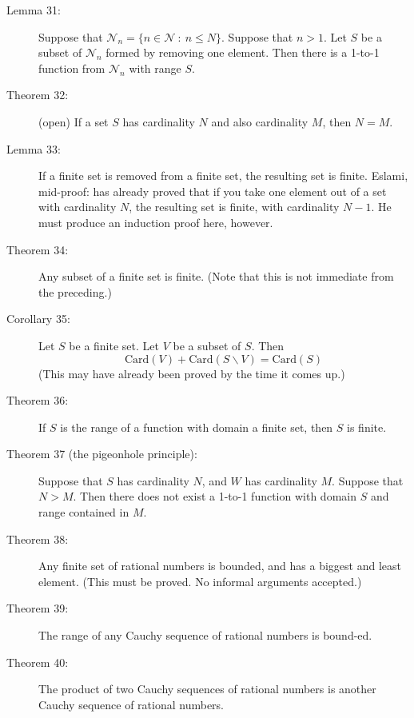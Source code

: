 \documentclass{article}
\begin{document}
\begin{description}
  \item[Lemma 31:] Suppose that $\mathcal{N}_{n}= \{ n \in \mathcal{N}\ :\ n \leq N \}$. Suppose that $n>1$. Let $S$ be a subset of $\mathcal{N}_{n}$ formed by removing one element. Then there is a 1-to-1 function from $\mathcal{N}_{n}$ with range $S$. 

  \item[Theorem 32:] (open) If a set $S$ has cardinality $N$ and also cardinality $M$, then $N = M$.

  \item[Lemma 33:] If a finite set is removed from a finite set, the resulting set is finite. Eslami, mid-proof: has already proved that if you take one element out of a set with cardinality $N$, the resulting set is finite, with cardinality $N-1$. He must produce an induction proof here, however. 

  \item[Theorem 34:] Any subset of a finite set is finite. (Note that this is not immediate from the preceding.) 

  \item[Corollary 35:] Let $S$ be a finite set. Let $V$ be a subset of $S$. Then
    \begin{equation*}
    \text{Card} (V) + \text{Card} (S \backslash V) = \text{Card} (S)
    \end{equation*}
    (This may have already been proved by the time it comes up.)

  \item[Theorem 36:] If $S$ is the range of a function with domain a finite set, then $S$ is finite. 

  \item[Theorem 37 (the pigeonhole principle):] Suppose that $S$ has cardinality $N$, and $W$ has cardinality $M$. Suppose that $N > M$. Then there does not exist a 1-to-1 function with domain $S$ and range contained in $M$. 

  \item[Theorem 38:] Any finite set of rational numbers is bounded, and has a biggest and least element. (This must be proved. No informal arguments accepted.) 

  \item[Theorem 39:] The range of any Cauchy sequence of rational numbers is bound-ed. 

  \item[Theorem 40:] The product of two Cauchy sequences of rational numbers is another Cauchy sequence of rational numbers. 


\end{description}
\end{document}
